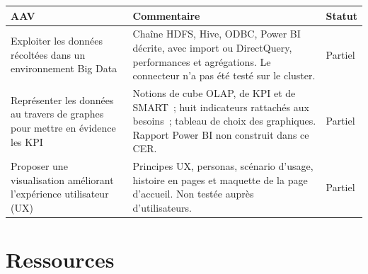 \begin{center}
\small
\setlength{\tabcolsep}{8pt}
\renewcommand{\arraystretch}{1.15}

\begin{tabular}{|>{\raggedright\arraybackslash}p{}|>{\raggedright\arraybackslash}p{}|m{}|}
\hline
\textbf{AAV} & \textbf{Commentaire} & \textbf{Statut} \\ \hline

Exploiter les données récoltées dans un environnement Big Data &
Chaîne HDFS, Hive, ODBC, Power BI décrite, avec import ou DirectQuery, performances et agrégations. Le connecteur n'a pas été testé sur le cluster. &
{\color{orange}Partiel} \\ \hline

Représenter les données au travers de graphes pour mettre en évidence les KPI &
Notions de cube OLAP, de KPI et de SMART~; huit indicateurs rattachés aux besoins~; tableau de choix des graphiques. Rapport Power BI non construit dans ce CER. &
{\color{orange}Partiel} \\ \hline

Proposer une visualisation améliorant l'expérience utilisateur (UX) &
Principes UX, personas, scénario d'usage, histoire en pages et maquette de la page d'accueil. Non testée auprès d'utilisateurs. &
{\color{orange}Partiel} \\ \hline

\end{tabular}
\end{center}

\section*{Ressources}
{}

